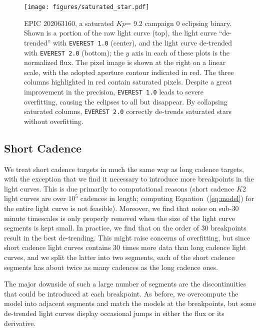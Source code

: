 \documentclass[]{aastex62}
\newcommand{\Kp}{\ensuremath{Kp}}
\begin{document}
\begin{figure}[hbt]
  \begin{center}
      \texttt{[image: figures/saturated\_star.pdf]}
       \caption{EPIC 202063160, a saturated \Kp = 9.2 campaign 0 eclipsing
       binary. Shown is a portion of the raw light curve (top), the light curve ``de-trended''
       with \texttt{EVEREST 1.0} (center), and the light curve de-trended with \texttt{EVEREST 2.0}
       (bottom); the $y$ axis in each of these plots is the normalized flux.
       The pixel image is shown at the right on a linear scale, with the adopted aperture
       contour indicated in red. The three columns highlighted in red contain saturated
       pixels. Despite a great improvement in the precision, \texttt{EVEREST 1.0} leads to severe
       overfitting, causing the eclipses to all but disappear. By collapsing saturated columns,
       \texttt{EVEREST 2.0} correctly de-trends saturated stars without overfitting.}
     \label{fig:saturated_star}
  \end{center}
\end{figure}

\subsection{Short Cadence}
\label{sec:impl_shortcad}
We treat short cadence targets in much the same way as long cadence targets, with the exception
that we find it necessary to introduce more breakpoints in the light curves. This is
due primarily to computational reasons (short cadence $K2$ light curves are over $10^5$ cadences
in length; computing Equation~(\ref{eq:model}) for the entire light curve is not feasible).
Moreover, we find that noise on sub-30 minute timescales is only properly removed when
the size of the light curve segments is kept small. In practice, we find that on the order of
30 breakpoints result in the best de-trending. This might raise concerns of overfitting, but
since short cadence light curves contains 30 times more data than long cadence light curves,
and we split the latter into two segments, each of the short cadence segments has about twice
as many cadences as the long cadence ones.

The major downside of such a large number of segments are the discontinuities that could
be introduced at each breakpoint. As before, we overcompute the model into adjacent
segments and match the models at the breakpoints, but some de-trended light curves display
occasional jumps in either the flux or its derivative.
\end{document}
